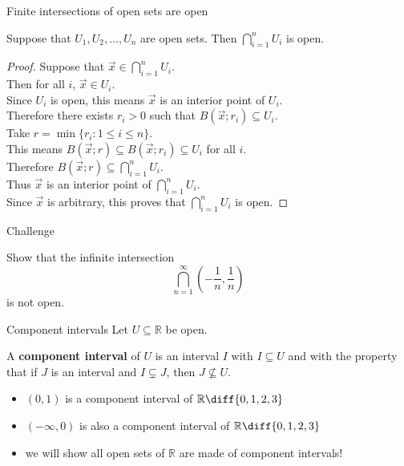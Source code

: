 \documentclass{beamer}
\begin{document}
\begin{frame}{Finite intersections of open sets are open}
\begin{thm}
Suppose that $U_1,U_2,\dots,U_n$ are open sets.
Then $\bigcap_{i=1}^n U_i$ is open.
\end{thm}
\pause
\begin{proof}
\pause
Suppose that $\vec x\in \bigcap_{i=1}^n U_i$.\\
\pause
Then for all $i$, $\vec x\in U_i$.\\
\pause
Since $U_i$ is open, this means $\vec x$ is an interior point of $U_i$.\\
\pause
Therefore there exists $r_i>0$ such that $B(\vec x; r_i)\subseteq U_i$.\\
\pause
Take $r = \min\{r_i: 1\leq i \leq n\}$.\\
\pause
This means $B(\vec x; r)\subseteq B(\vec x; r_i)\subseteq U_i$ for all $i$.\\
\pause
Therefore $B(\vec x; r)\subseteq \bigcap_{i=1}^n U_i$.\\
\pause
Thus $\vec x$ is an interior point of $\bigcap_{i=1}^n U_i$.\\
\pause
Since $\vec x$ is arbitrary, this proves that $\bigcap_{i=1}^n U_i$ is open.
\end{proof}
\end{frame}

\begin{frame}{Challenge}
\begin{prob}
Show that the infinite intersection
$$\bigcap_{n=1}^\infty (-\frac{1}{n},\frac{1}{n})$$
is not open.
\end{prob}
\end{frame}

\begin{frame}{Component intervals}
Let $U\subseteq \mathbb{R}$ be open.
\pause
\begin{defn}
A \textbf{component interval} of $U$ is an interval $I$ with $I\subseteq U$ and with the property that if $J$ is an interval and $I\subsetneq J$, then $J\nsubseteq U$.
\end{defn}
\begin{itemize}
\pause
\item $(0,1)$ is a component interval of $\mathbb{R}\diff \{0,1,2,3\}$
\pause
\item $(-\infty,0)$ is also a component interval of $\mathbb{R}\diff \{0,1,2,3\}$
\pause
\item we will show all open sets of $\mathbb{R}$ are made of component intervals!
\end{itemize}
\end{frame}
\end{document}
